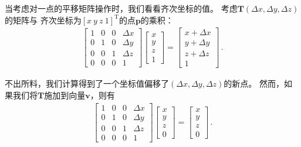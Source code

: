 当考虑对一点的平移矩阵操作时，我们看看齐次坐标的值。
考虑$\bm T(\Delta x,\Delta y, \Delta z)$的矩阵与
齐次坐标为$[x\ y\ z\ 1]^\mathrm{T}$的点$\bm p$的乘积：
\begin{align*}
    \left[
        \begin{array}{cccc}
            1 & 0 & 0 & \Delta x \\
            0 & 1 & 0 & \Delta y \\
            0 & 0 & 1 & \Delta z \\
            0 & 0 & 0 & 1
        \end{array}
        \right]\left[
        \begin{array}{c}
            x \\y\\z\\1
        \end{array}
        \right]=\left[
        \begin{array}{c}
            x+\Delta x \\y+\Delta y\\z+\Delta z\\1
        \end{array}
        \right]\, .
\end{align*}

不出所料，我们计算得到了一个坐标值偏移了$(\Delta x,\Delta y, \Delta z)$的新点。
然而，如果我们将$\bm T$施加到向量$\bm v$，则有
\begin{align*}
    \left[
        \begin{array}{cccc}
            1 & 0 & 0 & \Delta x \\
            0 & 1 & 0 & \Delta y \\
            0 & 0 & 1 & \Delta z \\
            0 & 0 & 0 & 1
        \end{array}
        \right]\left[
        \begin{array}{c}
            x \\y\\z\\0
        \end{array}
        \right]=\left[
        \begin{array}{c}
            x \\y\\z\\0
        \end{array}
        \right]\, .
\end{align*}

